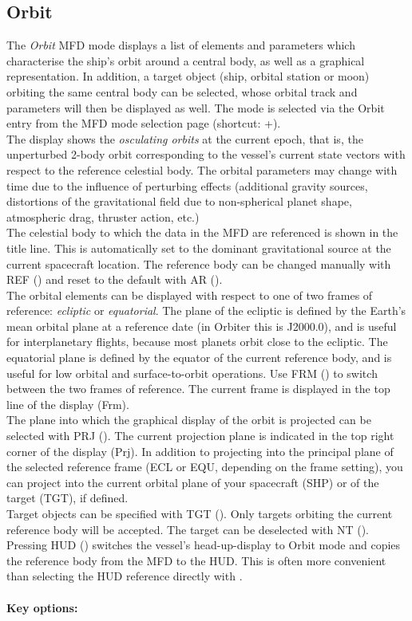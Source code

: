 \documentclass[Orbiter User Manual.tex]{subfiles}
\begin{document}
\subsection{Orbit}
The \textit{Orbit} MFD mode displays a list of elements and parameters which characterise the ship's orbit around a central body, as well as a graphical representation. In addition, a target object (ship, orbital station or moon) orbiting the same central body can be selected, whose orbital track and parameters will then be displayed as well. The mode is selected via the Orbit entry from the MFD mode selection page (shortcut: \Shift{}+\Shift{}).\\
The display shows the \textit{osculating orbits} at the current epoch, that is, the unperturbed 2-body orbit corresponding to the vessel's current state vectors with respect to the reference celestial body. The orbital parameters may change with time due to the influence of perturbing effects (additional gravity sources, distortions of the gravitational field due to non-spherical planet shape, atmospheric drag, thruster action, etc.)\\
The celestial body to which the data in the MFD are referenced is shown in the title line. This is automatically set to the dominant gravitational source at the current spacecraft location. The reference body can be changed manually with REF (\Shift{}) and reset to the default with AR (\Shift{}).\\
The orbital elements can be displayed with respect to one of two frames of reference: \textit{ecliptic} or \textit{equatorial}. The plane of the ecliptic is defined by the Earth's mean orbital plane at a reference date (in Orbiter this is J2000.0), and is useful for interplanetary flights, because most planets orbit close to the ecliptic. The equatorial plane is defined by the equator of the current reference body, and is useful for low orbital and surface-to-orbit operations. Use FRM (\Shift{}) to switch between the two frames of reference. The current frame is displayed in the top line of the display (Frm).\\
The plane into which the graphical display of the orbit is projected can be selected with PRJ (\Shift{}). The current projection plane is indicated in the top right corner of the display (Prj). In addition to projecting into the principal plane of the selected reference frame (ECL or EQU, depending on the frame setting), you can project into the current orbital plane of your spacecraft (SHP) or of the target (TGT), if defined.\\
Target objects can be specified with TGT (\Shift{}). Only targets orbiting the current reference body will be accepted. The target can be deselected with NT (\Shift{}).\\
Pressing HUD (\Shift{}) switches the vessel's head-up-display to Orbit mode and copies the reference body from the MFD to the HUD. This is often more convenient than selecting the HUD reference directly with \Ctrl{}.\\
\\
\textbf{Key options:}
\end{document}
